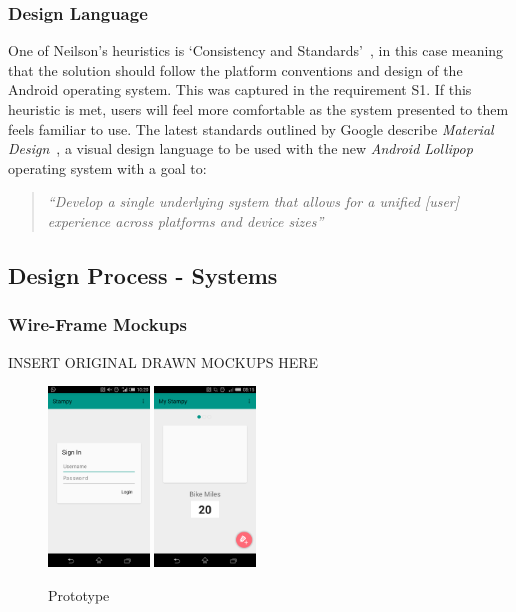 \subsubsection{Design Language}
One of Neilson's heuristics is `Consistency and Standards'~\cite{jakob}, in this case meaning that the solution should follow the platform conventions and design of the Android operating system. This was captured in the requirement S1. If this heuristic is met, users will feel more comfortable as the system presented to them feels familiar to use. The latest standards outlined by Google describe \emph{Material Design}~\cite{materialDesign}, a visual design language to be used with the new \emph{Android Lollipop} operating system with a goal to:
\begin{quote}
    \textit{``Develop a single underlying system that allows for a unified [user] experience across platforms and device sizes''}~\cite[Introduction]{materialDesign}
\end{quote}


\subsection{Design Process - Systems}

\subsubsection{Wire-Frame Mockups}
INSERT ORIGINAL DRAWN MOCKUPS HERE
\begin{figure}[H]
 \centering
  \includegraphics[width=0.24\textwidth]{img/loginMockup.png}
   \includegraphics[width=0.24\textwidth]{img/MainMockup.png}
    \caption{Prototype}
\end{figure}

